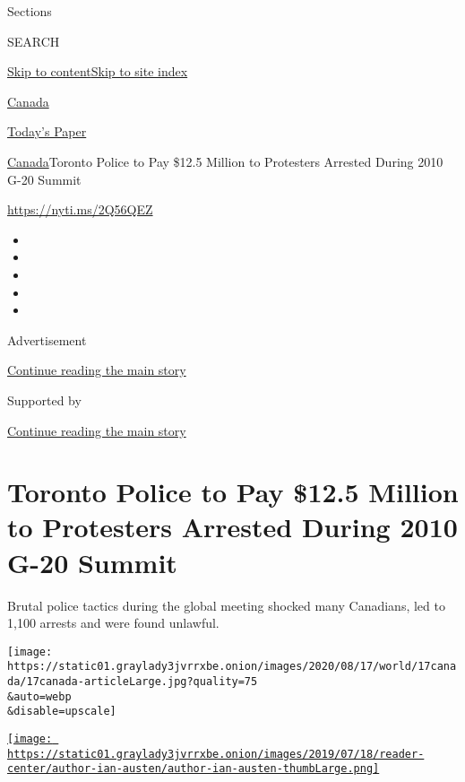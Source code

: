 Sections

SEARCH

\protect\hyperlink{site-content}{Skip to
content}\protect\hyperlink{site-index}{Skip to site index}

\href{https://www.nytimes3xbfgragh.onion/section/world/canada}{Canada}

\href{https://myaccount.nytimes3xbfgragh.onion/auth/login?response_type=cookie\&client_id=vi}{}

\href{https://www.nytimes3xbfgragh.onion/section/todayspaper}{Today's
Paper}

\href{/section/world/canada}{Canada}\textbar{}Toronto Police to Pay
\$12.5 Million to Protesters Arrested During 2010 G-20 Summit

\url{https://nyti.ms/2Q56QEZ}

\begin{itemize}
\item
\item
\item
\item
\item
\end{itemize}

Advertisement

\protect\hyperlink{after-top}{Continue reading the main story}

Supported by

\protect\hyperlink{after-sponsor}{Continue reading the main story}

\hypertarget{toronto-police-to-pay-125-million-to-protesters-arrested-during-2010-g-20-summit}{%
\section{Toronto Police to Pay \$12.5 Million to Protesters Arrested
During 2010 G-20
Summit}\label{toronto-police-to-pay-125-million-to-protesters-arrested-during-2010-g-20-summit}}

Brutal police tactics during the global meeting shocked many Canadians,
led to 1,100 arrests and were found unlawful.

\texttt{[image: https://static01.graylady3jvrrxbe.onion/images/2020/08/17/world/17canada/17canada-articleLarge.jpg?quality=75\\\&auto=webp\\\&disable=upscale]}

\href{https://www.nytimes3xbfgragh.onion/by/ian-austen}{\texttt{[image: https://static01.graylady3jvrrxbe.onion/images/2019/07/18/reader-center/author-ian-austen/author-ian-austen-thumbLarge.png]}}

